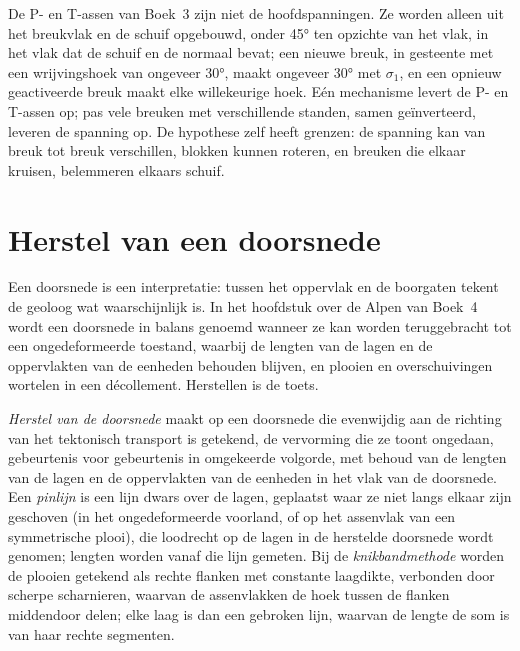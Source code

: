 De P- en T-assen van Boek~3 zijn niet de hoofdspanningen. Ze worden
alleen uit het breukvlak en de schuif opgebouwd, onder \ang{45} ten opzichte van het vlak,
in het vlak dat de schuif en de normaal bevat; een nieuwe breuk, in gesteente met
een wrijvingshoek van ongeveer \ang{30}, maakt ongeveer \ang{30} met $\sigma_1$, en een
opnieuw geactiveerde breuk maakt elke willekeurige hoek. Eén mechanisme levert de P- en T-assen op; pas vele
breuken met verschillende standen, samen geïnverteerd, leveren de spanning op. De
hypothese zelf heeft grenzen: de spanning kan van breuk tot breuk verschillen, blokken
kunnen roteren, en breuken die elkaar kruisen, belemmeren elkaars schuif.

\section{Herstel van een doorsnede}\label{sec:b3:structural-analysis:restoration}

Een doorsnede is een interpretatie: tussen het oppervlak en de boorgaten
tekent de geoloog wat waarschijnlijk is. In het hoofdstuk over de Alpen van Boek~4
wordt een doorsnede in balans genoemd wanneer ze kan worden teruggebracht tot een ongedeformeerde
toestand, waarbij de lengten van de lagen en de oppervlakten van de eenheden behouden blijven, en plooien
en overschuivingen wortelen in een décollement. Herstellen is de toets.

\begin{definition}\label{def:b3:structural-analysis:restoration}
\emph{Herstel van de doorsnede} maakt op een
doorsnede die evenwijdig aan de richting van het tektonisch transport is getekend, de
vervorming die ze toont ongedaan, gebeurtenis voor gebeurtenis in omgekeerde volgorde, met behoud van de
lengten van de lagen en de oppervlakten van de eenheden in het vlak van de doorsnede.
Een \emph{pinlijn} is een lijn dwars over de lagen, geplaatst waar ze
niet langs elkaar zijn geschoven (in het ongedeformeerde voorland, of op het assenvlak
van een symmetrische plooi), die loodrecht op de lagen
in de herstelde doorsnede wordt genomen; lengten worden vanaf die lijn gemeten. Bij de
\emph{knikbandmethode} worden de plooien getekend als rechte
flanken met constante laagdikte, verbonden door scherpe scharnieren, waarvan de assenvlakken
de hoek tussen de flanken middendoor delen; elke laag is dan een gebroken lijn, waarvan de
lengte de som is van haar rechte segmenten.
\end{definition}

